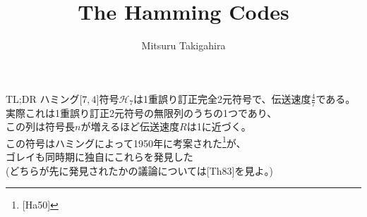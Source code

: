 \documentclass[dvipdfmx,10pt,jsarticle]{beamer}
\title{The Hamming Codes}
\author{Mitsuru Takigahira}
\date[2017/12/01]{}
\newcommand{\code}[1]{\mathcal{#1}}
\newcommand{\bracket}[1]{\lbrack{} #1 \rbrack}
\newcommand{\vcode}[2]{$\bracket{#1 , #2}$}
\begin{document}
  \frame{\maketitle}
  \begin{frame}{TL;DR}
    ハミング\vcode74符号$\code{H}_7$は1重誤り訂正完全2元符号で、伝送速度$\frac 47$である。 \\
    実際これは1重誤り訂正2元符号の無限列のうちの1つであり、\\
    この列は符号長$n$が増えるほど伝送速度$R$は1に近づく。 \\
    この符号はハミングによって1950年に考案された\footnote{[Ha50]}が、 \\
    ゴレイも同時期に独自にこれらを発見した \\
    (どちらが先に発見されたかの議論については[Th83]を見よ。)
  \end{frame}
\end{document}
